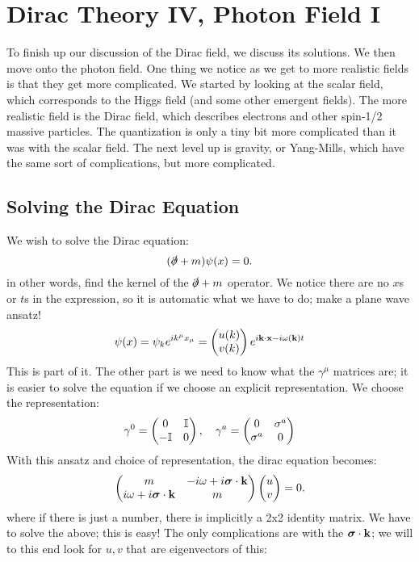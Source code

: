 \section{Dirac Theory IV, Photon Field I}
To finish up our discussion of the Dirac field, we discuss its solutions. We then move onto the photon field. One thing we notice as we get to more realistic fields is that they get more complicated. We started by looking at the scalar field, which corresponds to the Higgs field (and some other emergent fields). The more realistic field is the Dirac field, which describes electrons and other spin-1/2 massive particles. The quantization is only a tiny bit more complicated than it was with the scalar field. The next level up is gravity, or Yang-Mills, which have the same sort of complications, but more complicated.


\subsection{Solving the Dirac Equation}
We wish to solve the Dirac equation:
\begin{equation}
    (\slashed{\partial} + m)\psi(x) = 0.
\end{equation}
in other words, find the kernel of the $\slashed{\partial} + m$ operator. We notice there are no $x$s or $t$s in the expression, so it is automatic what we have to do; make a plane wave ansatz!
\begin{equation}
    \psi(x) = \psi_ke^{ik^\mu x_\mu} = \begin{pmatrix}u(k) \\ v(k)\end{pmatrix}e^{i\mathbf{k} \cdot \mathbf{x} - i\omega(\mathbf{k}) t}
\end{equation}
This is part of it. The other part is we need to know what the $\gamma^\mu$ matrices are; it is easier to solve the equation if we choose an explicit representation. We choose the representation:
\begin{equation}
    \gamma^0 = \begin{pmatrix}0 & \mathbb{I} \\ -\mathbb{I} & 0\end{pmatrix}, \quad \gamma^a = \begin{pmatrix}0 & \sigma^a \\ \sigma^a & 0\end{pmatrix}
\end{equation}
With this ansatz and choice of representation, the dirac equation becomes:
\begin{equation}
    \begin{pmatrix}m & -i\omega + i\mbox{\boldmath$ \sigma $} \cdot \mathbf{k} \\ i\omega + i\mbox{\boldmath$ \sigma $} \cdot \mathbf{k} & m\end{pmatrix} \begin{pmatrix}u \\ v\end{pmatrix} = 0.
\end{equation}
where if there is just a number, there is implicitly a 2x2 identity matrix. We have to solve the above; this is easy! The only complications are with the $\mbox{\boldmath$ \sigma $} \cdot \mathbf{k}$; we will to this end look for $u, v$ that are eigenvectors of this:
